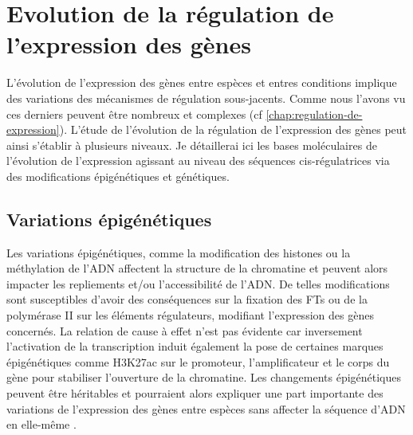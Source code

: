 \section{Evolution de la régulation de l’expression des gènes}
\label{sec:evol-regul}

L’évolution de l’expression des gènes entre espèces et entres \glspl{condition} implique des variations des mécanismes de régulation sous-jacents. Comme nous l’avons vu ces derniers peuvent être nombreux et complexes (cf \ref{chap:regulation-de-expression}). L’étude de l’évolution de la régulation de l’expression des gènes peut ainsi s’établir à plusieurs niveaux. Je détaillerai ici les bases moléculaires de l’évolution de l’expression agissant au niveau des séquences \gls{cis}-régulatrices via des modifications épigénétiques et génétiques.

\subsection{Variations épigénétiques}
\label{subsec:variation-epigenet}

Les variations épigénétiques, comme la modification des histones ou la méthylation de l’ADN affectent la structure de la chromatine et peuvent alors impacter les repliements et/ou l’accessibilité de l’ADN. De telles modifications sont susceptibles d’avoir des conséquences sur la fixation des \acrshort{FT}s ou de la polymérase II sur les éléments régulateurs, modifiant l’expression des gènes concernés. La relation de cause à effet n’est pas évidente car inversement l’activation de la transcription induit également la pose de certaines marques épigénétiques comme H3K27ac sur le promoteur, l’\gls{amplificateur} et le corps du gène pour stabiliser l’ouverture de la chromatine. Les changements épigénétiques peuvent être héritables et pourraient alors expliquer une part importante des variations de l’expression des gènes entre espèces sans affecter la séquence d’ADN en elle-même \citep{lind_evolutionary_2018}. \\

